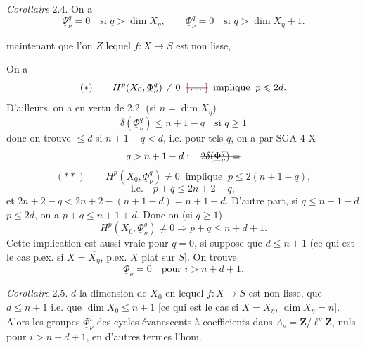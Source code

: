 \documentclass[11pt,a4paper]{article}
\begin{document}
\emph{Corollaire} 2.4. On a
\[
\underline{\Psi}^q_\nu = 0 \quad \text{si } q > \dim X_\eta , \qquad \underline{\Phi}^q_\nu = 0 \quad \text{si } q > \dim X_\eta + 1 .
\]


   maintenant que l'on \struck{\ill{}}  $Z$   lequel   $f : X \to S$ est non lisse, \uncertain{\ill{}}   \struck{\ill{}} 

On a \struck{\ill{}}  \ill{}
\[
(*) \qquad H^p(X_0, \underline{\Phi}^q_\nu) \neq 0 \;\; \text{\struck{\ill{}}} \;\; \text{implique} \;\; p \leqslant 2d .
\]
D'ailleurs, on a en vertu de 2.2. (si $n = \dim X_{\overline{\eta}}$)
\[
\delta(\underline{\Phi}^q_\nu) \leqslant n + 1 - q \quad \text{si } q \geqslant 1
\]
donc on trouve  $\leqslant d$ si $n + 1 - q < d$, i.e. \struck{\ill{}} pour  tels $q$, \struck{\ill{}} on a par SGA 4 X
\[
q > n + 1 - d \; ; \quad \text{\struck{$2\delta(\underline{\Phi}^q_\nu) =$}}
\]
\[
(**) \qquad H^p(X_0, \underline{\Phi}^q_\nu) \neq 0 \;\; \text{implique} \;\; p \leqslant 2(n + 1 - q) ,
\]
\[
\text{i.e.} \quad p + q \leqslant 2n + 2 - q ,
\]
et   $2n + 2 - q < 2n + 2 - (n + 1 - d) = n + 1 + d$. D'autre part, si $q \leqslant n + 1 - d$   $p \leqslant 2d$, on a  $p + q \leqslant n + 1 + d$. Donc on  (si $q \geqslant 1$)
\[
H^p(X_0, \underline{\Phi}^q_\nu) \neq 0 \Longrightarrow p + q \leqslant n + d + 1 .
\]
Cette implication est aussi vraie pour $q = 0$, si   \struck{\ill{}} suppose que $d \leqslant n + 1$ (ce qui est le cas p.ex. si $X = \overline{X_\eta}$, \struck{\ill{}} \uncertain{\ill{}} p.ex. $X$ plat sur $S$]. On trouve \uncertain{\ill{}}
\[
\underline{\Phi}_\nu = 0 \quad \text{pour } i > n + d + 1 .
\]

\emph{Corollaire} 2.5.      $d$ la dimension \struck{\ill{}} \add{\ill{}}  de $X_0$ en lequel $f : X \to S$ est non lisse,  \struck{\ill{}}  que $d \leqslant n + 1$ i.e. que $\dim X_0 \leqslant n + 1$ [ce qui est le cas si $X = \overline{X_\eta}$,  $\dim X_\eta = n$]. Alors les groupes $\underline{\Phi}^i_\nu$ des cycles évanescents  à coefficients dans $\Lambda_\nu = \mathbf{Z}/\ell^\nu \mathbf{Z}$,  nuls pour  $i > n + d + 1$, en d'autres termes l'hom.
\end{document}
